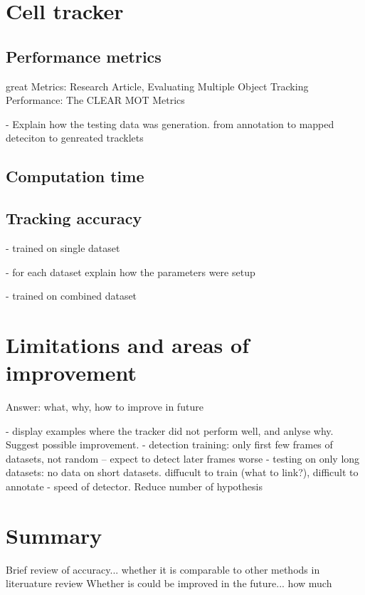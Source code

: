 	\section{Cell tracker \statusnew}
		\label{sec:results_tracker}
		\subsection{Performance metrics \statusnew}
		
		great Metrics: Research Article, Evaluating Multiple Object Tracking Performance: The CLEAR MOT Metrics
		
		- Explain how the testing data was generation. from annotation to mapped deteciton to genreated tracklets
		\subsection{Computation time \statusnew}
		\subsection{Tracking accuracy \statusnew}
			
		
			- trained on single dataset
			
			- for each dataset explain how the parameters were setup
						
			- trained on combined dataset
	\section{Limitations and areas of improvement \statusnew}
		\label{sec:results_limitations}
		Answer: what, why, how to improve in future
				
		- display examples where the tracker did not perform well, and anlyse why. Suggest possible improvement.
		- detection training: only first few frames of datasets, not random -- expect to detect later frames worse
		- testing on only long datasets: no data on short datasets. diffucult to train (what to link?), difficult to annotate
		- speed of detector. Reduce number of hypothesis		

	\section{Summary \statusnew}
		\label{sec:results_summary}
		Brief review of accuracy... whether it is comparable to other methods in literuature review
		Whether is could be improved in the future... how much
